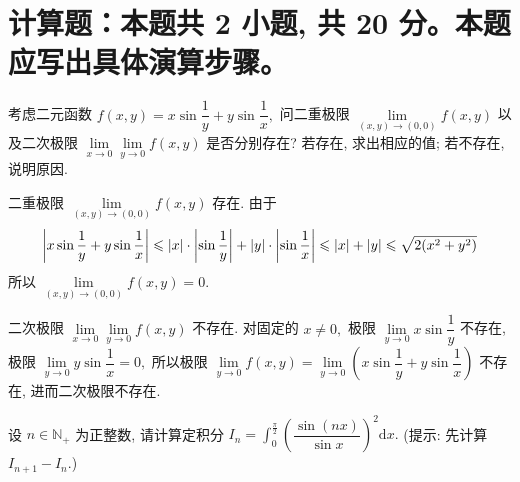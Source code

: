 \section{计算题：本题共 2 小题, 共 20 分。本题应写出具体演算步骤。}


\begin{question}[points = 10]
考虑二元函数 $f(x,y) = x\sin\dfrac{1}{y} + y\sin\dfrac{1}{x},$ 问二重极限 $\lim\limits_{(x,y) \to (0,0)} f(x,y)$ 以及二次极限 $\lim\limits_{x \to 0} \lim\limits_{y \to 0} f(x,y)$ 是否分别存在? 若存在, 求出相应的值; 若不存在, 说明原因.

\end{question}

\begin{solution}
二重极限 $\lim\limits_{(x,y) \to (0,0)} f(x,y)$ 存在.  由于
\begin{equation*}
\left| x\sin\dfrac{1}{y} + y\sin\dfrac{1}{x} \right| \leqslant |x| \cdot \left| \sin\dfrac{1}{y} \right| + |y| \cdot \left| \sin\dfrac{1}{x} \right| \leqslant |x| + |y| \leqslant \sqrt{2(x^2 + y^2)} \score{2}
\end{equation*}
所以 $\lim\limits_{(x,y) \to (0,0)} f(x,y) = 0.$ 

二次极限 $\lim\limits_{x \to 0}\lim\limits_{y \to 0} f(x,y)$ 不存在.  对固定的 $x \neq 0,$ 极限 $\lim\limits_{y \to 0} x\sin\dfrac{1}{y}$ 不存在, 极限 $\lim\limits_{y \to 0} y\sin\dfrac{1}{x} = 0,$  所以极限 $\lim\limits_{y \to 0} f(x,y) = \lim\limits_{y \to 0} \left( x\sin\dfrac{1}{y} + y\sin\dfrac{1}{x} \right)$ 不存在, 进而二次极限不存在. 
\end{solution}


\begin{question}[points = 10]
设 $n \in \mathbb{N}_+$ 为正整数, 请计算定积分 $\displaystyle I_n = \int_0^{\frac{\pi}{2}} \left(\dfrac{\sin (nx)}{\sin x}\right)^2 \mathrm{d}x.$ (提示: 先计算 $I_{n+1} - I_n.$)

\end{question}

